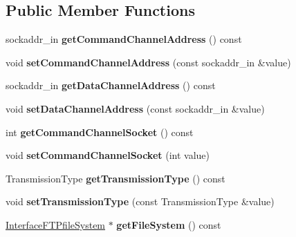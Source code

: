 \subsection*{Public Member Functions}
\begin{DoxyCompactItemize}
\item 
\mbox{\label{classAccountInfo_afc6cb2f3521a7ebf8d16f004f61533f4}} 
sockaddr\+\_\+in {\bfseries get\+Command\+Channel\+Address} () const
\item 
\mbox{\label{classAccountInfo_a473dfbf8850784ad41454d5e2086d172}} 
void {\bfseries set\+Command\+Channel\+Address} (const sockaddr\+\_\+in \&value)
\item 
\mbox{\label{classAccountInfo_af22c3388b12cd7f0073921d8416561a5}} 
sockaddr\+\_\+in {\bfseries get\+Data\+Channel\+Address} () const
\item 
\mbox{\label{classAccountInfo_a744ad5f4281ab1c2719c95554fcefd14}} 
void {\bfseries set\+Data\+Channel\+Address} (const sockaddr\+\_\+in \&value)
\item 
\mbox{\label{classAccountInfo_a646c0cf60d1817fbc0308527908f2eb0}} 
int {\bfseries get\+Command\+Channel\+Socket} () const
\item 
\mbox{\label{classAccountInfo_a8f26940fe646a532c98aec6ada6ee113}} 
void {\bfseries set\+Command\+Channel\+Socket} (int value)
\item 
\mbox{\label{classAccountInfo_ace3df4d708b419f64a6593d80bed5f32}} 
Transmission\+Type {\bfseries get\+Transmission\+Type} () const
\item 
\mbox{\label{classAccountInfo_a49608ec2fcbae0ff6a984fa6667808ce}} 
void {\bfseries set\+Transmission\+Type} (const Transmission\+Type \&value)
\item 
\mbox{\label{classAccountInfo_a268caf5cf743d60cfa4381de959d926a}} 
\hyperlink{classInterfaceFTPfileSystem}{Interface\+F\+T\+Pfile\+System} $\ast$ {\bfseries get\+File\+System} () const
\end{DoxyCompactItemize}
